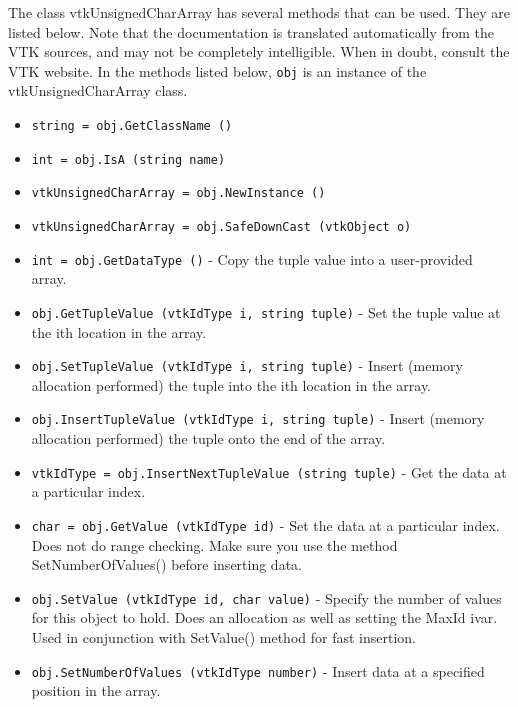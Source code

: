 The class vtkUnsignedCharArray has several methods that can be used.
  They are listed below.
Note that the documentation is translated automatically from the VTK sources,
and may not be completely intelligible.  When in doubt, consult the VTK website.
In the methods listed below, \verb|obj| is an instance of the vtkUnsignedCharArray class.
\begin{itemize}
\item  \verb|string = obj.GetClassName ()|

\item  \verb|int = obj.IsA (string name)|

\item  \verb|vtkUnsignedCharArray = obj.NewInstance ()|

\item  \verb|vtkUnsignedCharArray = obj.SafeDownCast (vtkObject o)|

\item  \verb|int = obj.GetDataType ()| -  Copy the tuple value into a user-provided array.

\item  \verb|obj.GetTupleValue (vtkIdType i, string tuple)| -  Set the tuple value at the ith location in the array.

\item  \verb|obj.SetTupleValue (vtkIdType i, string tuple)| -  Insert (memory allocation performed) the tuple into the ith location
 in the array.

\item  \verb|obj.InsertTupleValue (vtkIdType i, string tuple)| -  Insert (memory allocation performed) the tuple onto the end of the array.

\item  \verb|vtkIdType = obj.InsertNextTupleValue (string tuple)| -  Get the data at a particular index.

\item  \verb|char = obj.GetValue (vtkIdType id)| -  Set the data at a particular index. Does not do range checking. Make sure
 you use the method SetNumberOfValues() before inserting data.

\item  \verb|obj.SetValue (vtkIdType id, char value)| -  Specify the number of values for this object to hold. Does an
 allocation as well as setting the MaxId ivar. Used in conjunction with
 SetValue() method for fast insertion.

\item  \verb|obj.SetNumberOfValues (vtkIdType number)| -  Insert data at a specified position in the array.


\end{itemize}
